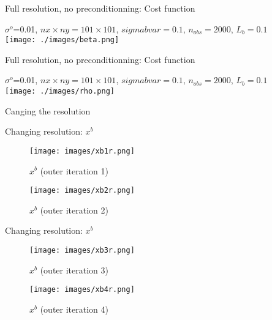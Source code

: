 \documentclass[francais]{beamer}
\begin{document}
\begin{frame}{Full resolution, no preconditionning: Cost function}
\begin{center}
$\sigma^o$=0.01, $nx\times ny=101 \times 101$, $sigmabvar=0.1$, $n_{obs}=2000$, $L_b=0.1$\\
 \texttt{[image: ./images/beta.png]}
\end{center}
\end{frame}

\begin{frame}{Full resolution, no preconditionning: Cost function}
\begin{center}
$\sigma^o$=0.01, $nx\times ny=101 \times 101$, $sigmabvar=0.1$, $n_{obs}=2000$, $L_b=0.1$\\
 \texttt{[image: ./images/rho.png]}
\end{center}
\end{frame}




\begin{frame}
\begin{center}
  \huge{Canging the resolution}
\end{center}
\end{frame}

\begin{frame}{Changing resolution: $x^b$}
\begin{center}
\begin{figure}
  \texttt{[image: images/xb1r.png]}
  \caption{$x^b$ (outer iteration 1)}
\endminipage\hfill
{}
  \texttt{[image: images/xb2r.png]}
  \caption{$x^b$ (outer iteration 2)}
\endminipage
\end{figure}
\end{center}
\end{frame}

\begin{frame}{Changing resolution: $x^b$}
\begin{center}
\begin{figure}
  \texttt{[image: images/xb3r.png]}
  \caption{$x^b$ (outer iteration 3)}
\endminipage \hfill
{}%
  \texttt{[image: images/xb4r.png]}
  \caption{$x^b$ (outer iteration 4)}
\endminipage
\end{figure}
\end{center}
\end{frame}
\end{document}
